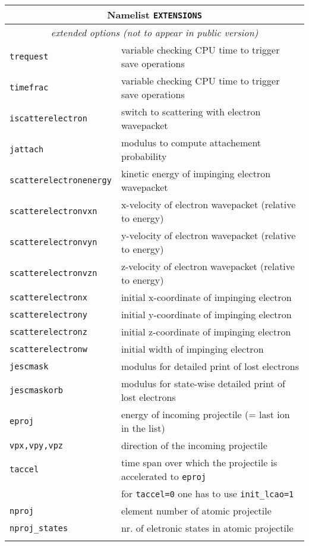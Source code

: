\documentclass[12pt]{article}
\begin{document}
\begin{tabular}{ll}
\hline
\multicolumn{2}{c}{Namelist {\tt EXTENSIONS}} in {\tt for005.<name>} \\
\hline
\multicolumn{2}{c}{\it extended options (not to appear in public version)} \\
\hline
{\tt trequest} &  variable checking CPU time to trigger save
operations \\
{\tt timefrac} &  variable checking CPU time to trigger save operations  \\
{\tt iscatterelectron} &  switch to scattering with electron wavepacket\\
{\tt jattach} &  modulus to compute attachement probability\\
{\tt scatterelectronenergy} &  kinetic energy of impinging electron wavepacket\\
{\tt scatterelectronvxn} &  x-velocity  of electron
wavepacket (relative to energy)\\
{\tt scatterelectronvyn} &  y-velocity  of electron
wavepacket (relative to energy) \\
{\tt scatterelectronvzn} &  z-velocity  of electron
wavepacket (relative to energy) \\
{\tt scatterelectronx} & initial x-coordinate of impinging electron \\
{\tt scatterelectrony} & initial y-coordinate of impinging electron  \\
{\tt scatterelectronz} & initial z-coordinate of impinging electron  \\
{\tt scatterelectronw} & initial width  of impinging electron \\
{\tt jescmask} & modulus for detailed print of lost electrons \\
{\tt jescmaskorb} & modulus for state-wise detailed print of lost electrons \\
{\tt eproj}& energy of incoming projectile (= last ion in the list)
\\
{\tt vpx,vpy,vpz}& direction of the incoming projectile
\\
{\tt taccel}& time span over which the projectile is accelerated to
             {\tt eproj}\\
& for {\tt taccel=0} one has to use {\tt init\_lcao=1}\\
{\tt nproj} & element number of atomic projectile \\
{\tt nproj\_states} & nr. of eletronic states in atomic projectile \\
\\
\hline
\end{tabular}
\end{document}
